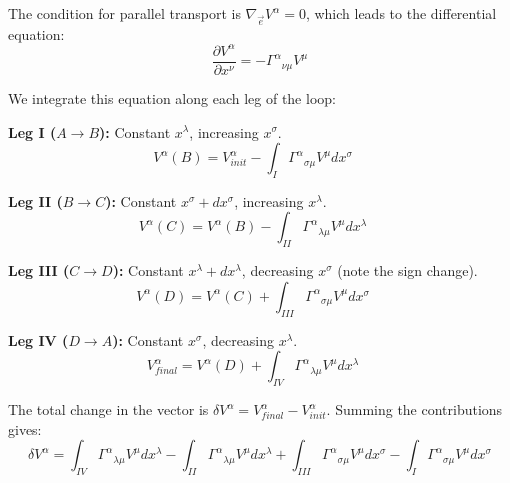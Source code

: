 \documentclass[11pt, a4paper]{report}
\begin{document}
The condition for parallel transport is $\nabla_{\vec{e}} V^{\alpha} = 0$, which leads to the differential equation:
\begin{equation}
    \frac{\partial V^{\alpha}}{\partial x^{\nu}} = -{\Gamma^{\alpha}}_{\nu\mu} V^{\mu}
\end{equation}

We integrate this equation along each leg of the loop:

\textbf{Leg I ($A \rightarrow B$):} Constant $x^{\lambda}$, increasing $x^{\sigma}$.
\begin{equation}
    V^{\alpha}(B) = V_{init}^{\alpha} - \int_{I} {\Gamma^{\alpha}}_{\sigma\mu} V^{\mu} dx^{\sigma} \quad \text{}
\end{equation}

\textbf{Leg II ($B \rightarrow C$):} Constant $x^{\sigma} + dx^{\sigma}$, increasing $x^{\lambda}$.
\begin{equation}
    V^{\alpha}(C) = V^{\alpha}(B) - \int_{II} {\Gamma^{\alpha}}_{\lambda\mu} V^{\mu} dx^{\lambda} \quad \text{}
\end{equation}

\textbf{Leg III ($C \rightarrow D$):} Constant $x^{\lambda} + dx^{\lambda}$, decreasing $x^{\sigma}$ (note the sign change).
\begin{equation}
    V^{\alpha}(D) = V^{\alpha}(C) + \int_{III} {\Gamma^{\alpha}}_{\sigma\mu} V^{\mu} dx^{\sigma} \quad \text{}
\end{equation}

\textbf{Leg IV ($D \rightarrow A$):} Constant $x^{\sigma}$, decreasing $x^{\lambda}$.
\begin{equation}
    V_{final}^{\alpha} = V^{\alpha}(D) + \int_{IV} {\Gamma^{\alpha}}_{\lambda\mu} V^{\mu} dx^{\lambda} \quad \text{}
\end{equation}

The total change in the vector is $\delta V^{\alpha} = V_{final}^{\alpha} - V_{init}^{\alpha}$. Summing the contributions gives:
\begin{equation}
    \delta V^{\alpha} = \int_{IV} {\Gamma^{\alpha}}_{\lambda\mu} V^{\mu} dx^{\lambda} - \int_{II} {\Gamma^{\alpha}}_{\lambda\mu} V^{\mu} dx^{\lambda} + \int_{III} {\Gamma^{\alpha}}_{\sigma\mu} V^{\mu} dx^{\sigma} - \int_{I} {\Gamma^{\alpha}}_{\sigma\mu} V^{\mu} dx^{\sigma}
\end{equation}
\end{document}
